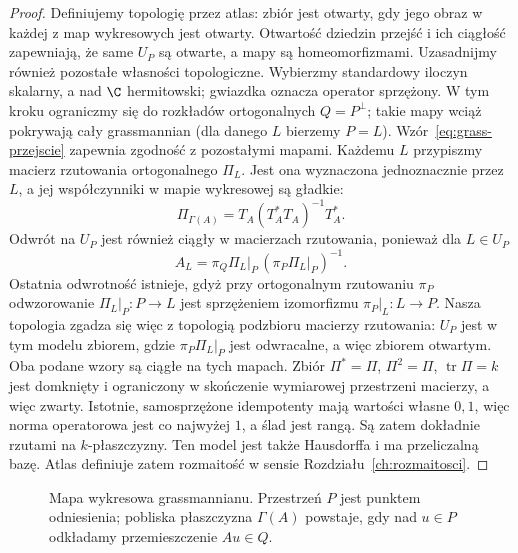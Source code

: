 \begin{proof}
Definiujemy topologię przez atlas: zbiór jest otwarty, gdy
jego obraz w każdej z map wykresowych jest otwarty.
Otwartość dziedzin przejść i ich ciągłość zapewniają, że
same $U_P$ są otwarte, a mapy są homeomorfizmami.
Uzasadnijmy również pozostałe własności topologiczne.
Wybierzmy standardowy iloczyn skalarny, a nad $\C$ hermitowski;
gwiazdka oznacza operator sprzężony. W tym kroku
ograniczmy się do rozkładów ortogonalnych $Q=P^\perp$;
takie mapy wciąż pokrywają cały grassmannian
(dla danego $L$ bierzemy $P=L$).
Wzór~\eqref{eq:grass-przejscie} zapewnia zgodność
z pozostałymi mapami. Każdemu $L$
przypiszmy macierz rzutowania ortogonalnego $\Pi_L$.
Jest ona wyznaczona jednoznacznie przez $L$, a jej
współczynniki w mapie wykresowej są gładkie:
\[
 \Pi_{\Gamma(A)}
  =T_A(T_A^*T_A)^{-1}T_A^*.
\]
Odwrót na $U_P$ jest również ciągły w macierzach
rzutowania, ponieważ dla $L\in U_P$
\[
 A_L=\pi_Q\Pi_L|_P\,(\pi_P\Pi_L|_P)^{-1}.
\]
Ostatnia odwrotność istnieje, gdyż przy ortogonalnym
rzutowaniu $\pi_P$ odwzorowanie $\Pi_L|_P:P\to L$
jest sprzężeniem izomorfizmu
$\pi_P|_L:L\to P$. Nasza topologia zgadza się więc
z topologią podzbioru macierzy rzutowania: $U_P$ jest w tym
modelu zbiorem, gdzie $\pi_P\Pi_L|_P$ jest odwracalne,
a więc zbiorem otwartym. Oba podane wzory są ciągłe na tych mapach.
Zbiór $\Pi^*=\Pi$, $\Pi^2=\Pi$, $\operatorname{tr}\Pi=k$
jest domknięty i ograniczony w skończenie wymiarowej
przestrzeni macierzy, a więc zwarty. Istotnie, samosprzężone
idempotenty mają wartości własne $0,1$, więc norma operatorowa
jest co najwyżej $1$, a ślad jest rangą. Są zatem dokładnie
rzutami na $k$-płaszczyzny. Ten model jest także
Hausdorffa i ma przeliczalną bazę. Atlas definiuje
zatem rozmaitość w sensie Rozdziału~\ref{ch:rozmaitosci}.
\end{proof}

\begin{figure}[!htbp]
\centering
{}
\caption{Mapa wykresowa grassmannianu. Przestrzeń $P$ jest
punktem odniesienia; pobliska płaszczyzna $\Gamma(A)$ powstaje,
gdy nad $u\in P$ odkładamy przemieszczenie $Au\in Q$.}
\label{fig:grass-wykres}
\end{figure}

